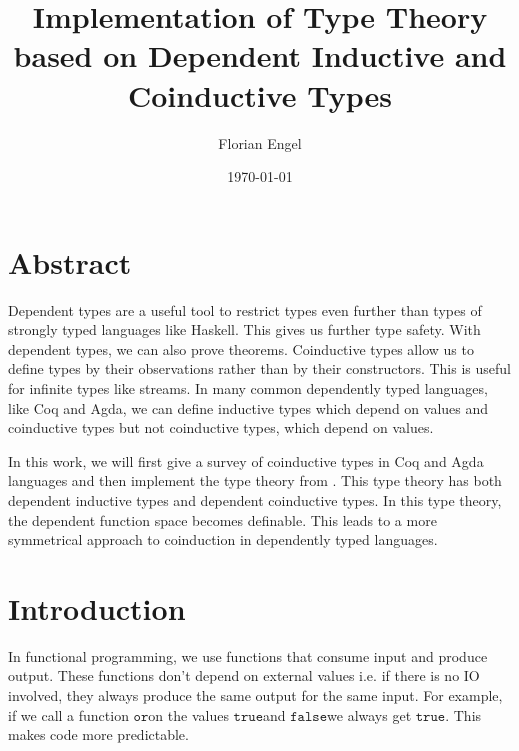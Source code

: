 \documentclass[a4paper,cleardoubleempty,BCOR1cm]{scrbook}
\author{Florian Engel}
\date{\today}
\title{Implementation of Type Theory based on Dependent Inductive and Coinductive Types}
\begin{document}
\maketitle


\chapter*{Abstract}
  Dependent types are a useful tool to restrict types even further than types of
  strongly typed languages like Haskell. This gives us further type safety. With
  dependent types, we can also prove theorems. Coinductive types allow us to define types by
  their observations rather than by their constructors. This is useful for
  infinite types like streams. In many common dependently typed languages, like
  Coq and Agda, we can define inductive types which depend on values and
  coinductive types but not coinductive types, which depend on values.

In this work, we will first give a survey of coinductive types in Coq and Agda
languages and then implement the type theory from \cite{basold2016type}. This
type theory has both dependent inductive types and dependent coinductive
types. In this type theory, the dependent function space becomes definable.
This leads to a more symmetrical approach to coinduction in dependently typed
languages.

\setcounter{tocdepth}{2}
\tableofcontents

\chapter{Introduction}
\label{sec:org64c1442}
In functional programming, we use functions that consume input and produce
output. These functions don't depend on external values i.e. if there is no IO
involved, they always produce the same output for the same input. For
example, if we call a function $\mathtt{or}$\;on the values $\mathtt{true}$\;and $\mathtt{false}$\;we always
get $\mathtt{true}$. This makes code more predictable.
\end{document}
